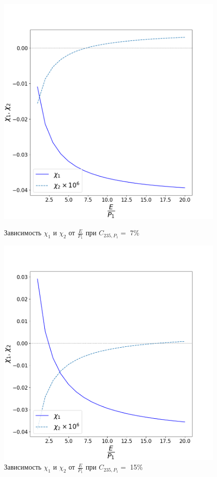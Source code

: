 \begin{figure}[ht]
  \begin{minipage}{.5\textwidth}
    \centering
    \includegraphics[width=.8\linewidth]{images/plots/Figure_7}  
    \caption{Зависимость $\chi_1$ и $\chi_2$ от $\frac{E}{P_1}$ при $C_{235, P_1}=$ 7\%}
    \label{delta1}
  \end{minipage}
  \begin{minipage}{.5\textwidth}
    \centering
    \includegraphics[width=.8\linewidth]{images/plots/Figure_15}  
    \caption{Зависимость $\chi_1$ и $\chi_2$ от $\frac{E}{P_1}$ при $C_{235, P_1}=$ 15\%}

\end{minipage}
\end{figure}
